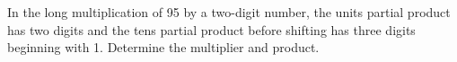 In the long multiplication of 95 by a two-digit number, the units partial product has two digits and the tens partial product before shifting has three digits beginning with 1. Determine the multiplier and product.
